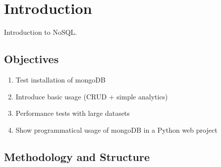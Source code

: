 \newpage

\listoftables
{}
\newpage


\listoffigures
{}
\newpage

\listoflistings
{}
\newpage

\renewcommand{\thepage}{\arabic{page}}

\setcounter{page}{1} 


\section{Introduction}
\label{sec:introduction}

Introduction to NoSQL.


\subsection{Objectives}
\label{sec:objectives}

\begin{enumerate}
  \item Test installation of mongoDB
  \item Introduce basic usage (CRUD + simple analytics)
  \item Performance tests with large datasets
  \item Show programmatical usage of mongoDB in a Python web project
\end{enumerate}

\subsection{Methodology and Structure}
\label{sec:objectives}

